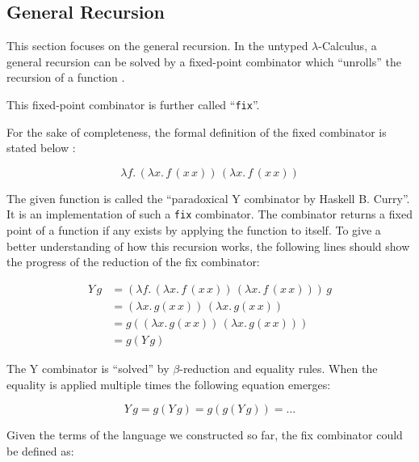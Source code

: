 \subsection{General Recursion}

This section focuses on the general recursion. In the untyped $\lambda$-Calculus,
a general recursion can be solved by a fixed-point combinator
which ``unrolls'' the recursion of a function \cite{pierce2002ProgLang}.

This fixed-point combinator is further called ``\texttt{fix}''.

For the sake of completeness, the formal definition of the fixed combinator
is stated below \cite{pierce2002ProgLang}:

\begin{equation*}
    \tag{Y combinator}
    \lambda f.\,(\lambda x.\,f\,(x\,x))\,(\lambda x.\,f\,(x\,x))
\end{equation*}

The given function is called the ``paradoxical Y combinator by Haskell B. Curry''.
It is an implementation of such a \texttt{fix} combinator. The combinator
returns a fixed point of a function if any exists by applying the function
to itself. To give a better understanding of how this recursion works, the
following lines should show the progress of the reduction of the fix combinator:

\begin{equation*}
    \begin{split}
        Y\,g & = (\lambda f.\,(\lambda x.\,f\,(x\,x))\,(\lambda x.\,f\,(x\,x)))\,g \\
        & = (\lambda x.\,g(x\,x))\,(\lambda x.\,g(x\,x)) \\
        & = g((\lambda x.\,g(x\,x))\,(\lambda x.\,g(x\,x))) \\
        & = g(Y\,g)
    \end{split}
\end{equation*}

The Y combinator is ``solved'' by $\beta$-reduction and equality rules. When the equality
is applied multiple times the following equation emerges:

\begin{equation*}
    Y\,g = g(Y\,g) = g(g(Y\,g)) = \dots
\end{equation*}

Given the terms of the language we constructed so far, the fix combinator could
be defined as: 

